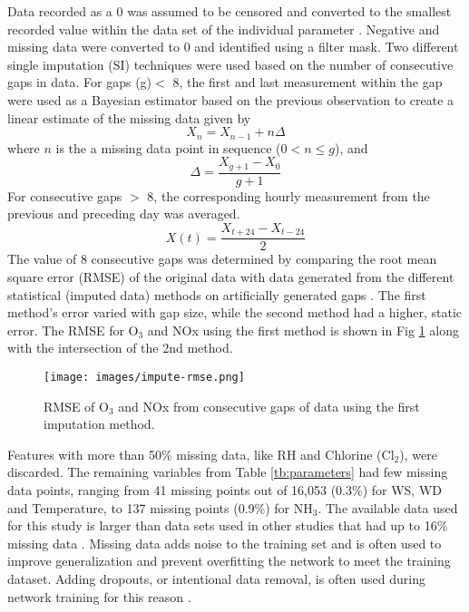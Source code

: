 Data recorded as a 0 was assumed to be censored and converted to the smallest recorded value within the data set of the individual parameter \citep{Rana2015}. Negative and missing data were converted to 0 and identified using a filter mask. Two different single imputation (SI) techniques were used based on the number of consecutive gaps in data. For gaps (g)$<$ 8, the first and last measurement within the gap were used as a Bayesian estimator based on the previous observation to create a linear estimate of the missing data given by 
%
\begin{equation}
\label{eq:impute1}
X_{n} = X_{n-1} + n\Delta
\end{equation}
%
\noindent
where $n$ is the a missing data point in sequence ($0 < n \leq g$), and 
%
\begin{equation}
\label{eq:impute2}
\Delta = \frac{X_{g+1} - X_{0}}{g+1}
\end{equation}
%
For consecutive gaps $>$ 8, the corresponding hourly measurement from the previous and preceding day was averaged.
%
\begin{equation}
\label{eq:impute3}
X(t) = \frac{X_{t+24} - X_{t-24}}{2}
\end{equation}
%
The value of 8 consecutive gaps was determined by comparing the root mean square error (RMSE) of the original data with data generated from the different statistical (imputed data) methods on artificially generated gaps \citep{Junninen2004}. The first method's error varied with gap size, while the second method had a higher, static error. The RMSE for O$_{3}$ and NOx using the first method is shown in Fig \ref{fig:impute-rmse} along with the intersection of the 2nd method.
%
\begin{figure}[H]
\centering
\texttt{[image: images/impute-rmse.png]}
\caption{RMSE of O$_{3}$ and NOx from consecutive gaps of data using the first imputation method.}
\label{fig:impute-rmse}
\end{figure}
%
Features with more than 50\% missing data, like RH and Chlorine (Cl$_{2}$), were discarded. The remaining variables from Table \ref{tb:parameters} had few missing data points, ranging from 41 missing points out of 16,053 (0.3\%) for WS, WD and Temperature, to 137 missing points (0.9\%) for NH$_{3}$. The available data used for this study is larger than data sets used in other studies that had up to 16\% missing data \citep{Taspinar2015}. Missing data adds noise to the training set and is often used to improve generalization and prevent overfitting the network to meet the training dataset. Adding dropouts, or intentional data removal, is often used during network training for this reason \citep{Srivastava2014}.

